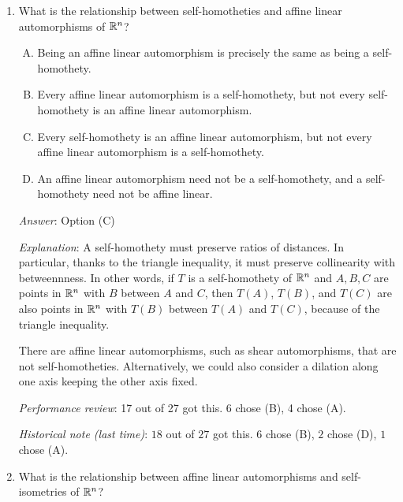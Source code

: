 \documentclass[10pt]{amsart}
\begin{document}
\begin{enumerate}
  {\em Explanation}: We can define a self-isometry as a self-homothety
  where the factor of homothety (the factor of similitude) is $1$.

  {\em Performance review}: 22 out of 27 got this. 4 chose (B), 1 chose (D).

  {\em Historical note (last time)}: $21$ out of $27$ got this. $4$ chose (D),
  $1$ each chose (A) and (B).

\item What is the relationship between self-homotheties and affine
  linear automorphisms of $\mathbb{R}^n$?

  \begin{enumerate}[(A)]
  \item Being an affine linear automorphism is precisely the same as
    being a self-homothety.
  \item Every affine linear automorphism is a self-homothety, but not
    every self-homothety is an affine linear automorphism.
  \item Every self-homothety is an affine linear automorphism, but not
    every affine linear automorphism is a self-homothety.
  \item An affine linear automorphism need not be a self-homothety,
    and a self-homothety need not be affine linear.
  \end{enumerate}

  {\em Answer}: Option (C)

  {\em Explanation}: A self-homothety must preserve ratios of
  distances. In particular, thanks to the triangle inequality, it must
  preserve collinearity with betweennness. In other words, if $T$ is a
  self-homothety of $\mathbb{R}^n$ and $A,B,C$ are points in $\mathbb{R}^n$ with $B$
  between $A$ and $C$, then $T(A)$, $T(B)$, and $T(C)$ are also points
  in $\mathbb{R}^n$ with $T(B)$ between $T(A)$ and $T(C)$, because of the
  triangle inequality.

  There are affine linear automorphisms, such as shear automorphisms,
  that are not self-homotheties. Alternatively, we could also consider
  a dilation along one axis keeping the other axis fixed.

  {\em Performance review}: 17 out of 27 got this. 6 chose (B), 4 chose (A).

  {\em Historical note (last time)}: $18$ out of $27$ got this. $6$ chose (B),
  $2$ chose (D), $1$ chose (A).

\item What is the relationship between affine linear automorphisms and
  self-isometries of $\mathbb{R}^n$?


\end{enumerate}
\end{document}
